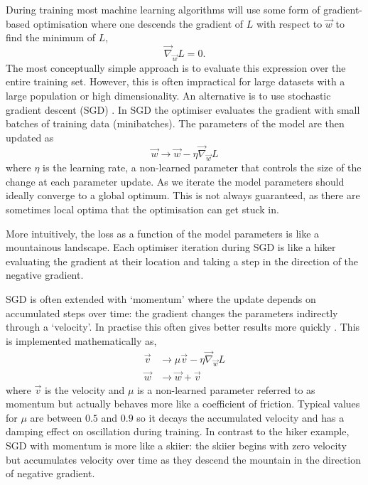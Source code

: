 During training most machine learning algorithms will use some form of gradient-based optimisation where one descends the gradient of $L$ with respect to $\vec{w}$ to find the minimum of $L$,
\begin{equation}
    \vec{\nabla}_{\vec{w}}L = 0.
\end{equation}
The most conceptually simple approach is to evaluate this expression over the entire training set. However, this is often impractical for large datasets with a large population or high dimensionality. 
An alternative is to use stochastic gradient descent (SGD) \cite{DeepLearningBook}. In SGD the optimiser evaluates the gradient with small batches of training data (minibatches). 
The parameters of the model are then updated as
\begin{equation}
    \vec{w} \rightarrow \vec{w} - \eta\vec{\nabla}_{\vec{w}}L
\end{equation}
where $\eta$ is the learning rate, a non-learned parameter that controls the size of the change at each parameter update. 
As we iterate the model parameters should ideally converge to a global optimum. 
This is not always guaranteed, as there are sometimes local optima that the optimisation can get stuck in. 

More intuitively, the loss as a function of the model parameters is like a mountainous landscape. 
Each optimiser iteration during SGD is like a hiker evaluating the gradient at their location and taking a step in the direction of the negative gradient.

SGD is often extended with `momentum' where the update depends on accumulated steps over time: the gradient changes the parameters indirectly through a `velocity'. 
In practise this often gives better results more quickly \cite{CS231n}.
This is implemented mathematically as,
\begin{equation}
    \begin{split}
        \vec{v} &\rightarrow \mu\vec{v} - \eta\vec{\nabla}_{\vec{w}}L \\
        \vec{w} &\rightarrow \vec{w} + \vec{v}
    \end{split}
\end{equation}
where $\vec{v}$ is the velocity and $\mu$ is a non-learned parameter referred to as momentum but actually behaves more like a coefficient of friction. 
Typical values for $\mu$ are between $0.5$ and $0.9$ so it decays the accumulated velocity and has a damping effect on oscillation during training. 
In contrast to the hiker example, SGD with momentum is more like a skiier: the skiier begins with zero velocity but accumulates velocity over time as they descend the mountain in the direction of negative gradient. 

